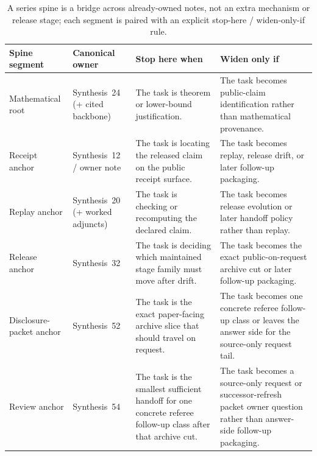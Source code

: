 \documentclass[11pt]{article}
\begin{document}
\begin{table}[t]
\centering
\small
\begin{tabularx}{\linewidth}{@{}L M Y Y@{}}
\toprule
Spine segment & Canonical owner & Stop here when & Widen only if \\
\midrule
Mathematical root & Synthesis~24 (+ cited backbone) & The task is theorem or lower-bound justification. & The task becomes public-claim identification rather than mathematical provenance. \\
Receipt anchor & Synthesis~12 / owner note & The task is locating the released claim on the public receipt surface. & The task becomes replay, release drift, or later follow-up packaging. \\
Replay anchor & Synthesis~20 (+ worked adjuncts) & The task is checking or recomputing the declared claim. & The task becomes release evolution or later handoff policy rather than replay. \\
Release anchor & Synthesis~32 & The task is deciding which maintained stage family must move after drift. & The task becomes the exact public-on-request archive cut or later follow-up packaging. \\
Disclosure-packet anchor & Synthesis~52 & The task is the exact paper-facing archive slice that should travel on request. & The task becomes one concrete referee follow-up class or leaves the answer side for the source-only request tail. \\
Review anchor & Synthesis~54 & The task is the smallest sufficient handoff for one concrete referee follow-up class after that archive cut. & The task becomes a source-only request or successor-refresh packet owner question rather than answer-side follow-up packaging. \\
\bottomrule
\end{tabularx}
\caption{A series spine is a bridge across already-owned notes, not an extra mechanism or release stage; each segment is paired with an explicit stop-here / widen-only-if rule.}
\label{tab:seriesspine}
\end{table}
\end{document}
